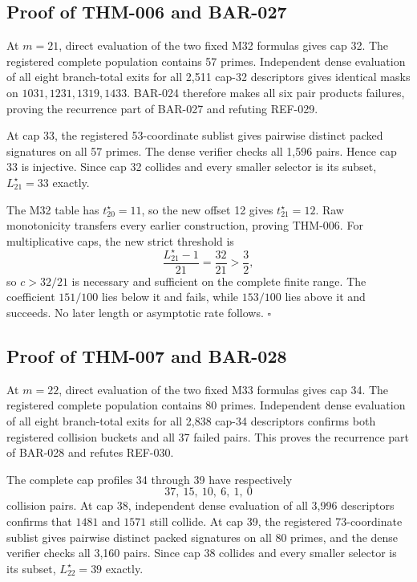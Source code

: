 \documentclass[11pt]{article}
\begin{document}
\subsection{Proof of THM-006 and BAR-027}
\label{proof:THM-006-BAR-027}

At \(m=21\), direct evaluation of the two fixed M32 formulas gives cap 32.
The registered complete population contains 57 primes. Independent dense
evaluation of all eight branch-total exits for all 2,511 cap-32 descriptors
gives identical masks on \(1031,1231,1319,1433\). BAR-024 therefore makes
all six pair products failures, proving the recurrence part of BAR-027 and
refuting REF-029.

At cap 33, the registered 53-coordinate sublist gives pairwise distinct
packed signatures on all 57 primes. The dense verifier checks all 1,596
pairs. Hence cap 33 is injective. Since cap 32 collides and every smaller
selector is its subset, \(L_{21}^\star=33\) exactly.

The M32 table has \(t_{20}^\star=11\), so the new offset 12 gives
\(t_{21}^\star=12\). Raw monotonicity transfers every earlier construction,
proving THM-006. For multiplicative caps, the new strict threshold is
\[
\frac{L_{21}^\star-1}{21}=\frac{32}{21}>\frac32,
\]
so \(c>32/21\) is necessary and sufficient on the complete finite range.
The coefficient \(151/100\) lies below it and fails, while \(153/100\) lies
above it and succeeds. No later length or asymptotic rate follows.
\(\square\)

\subsection{Proof of THM-007 and BAR-028}
\label{proof:THM-007-BAR-028}

At \(m=22\), direct evaluation of the two fixed M33 formulas gives cap 34.
The registered complete population contains 80 primes. Independent dense
evaluation of all eight branch-total exits for all 2,838 cap-34 descriptors
confirms both registered collision buckets and all 37 failed pairs. This
proves the recurrence part of BAR-028 and refutes REF-030.

The complete cap profiles 34 through 39 have respectively
\[
37,\ 15,\ 10,\ 6,\ 1,\ 0
\]
collision pairs. At cap 38, independent dense evaluation of all 3,996
descriptors confirms that \(1481\) and \(1571\) still collide. At cap 39,
the registered 73-coordinate sublist gives pairwise distinct packed
signatures on all 80 primes, and the dense verifier checks all 3,160 pairs.
Since cap 38 collides and every smaller selector is its subset,
\(L_{22}^\star=39\) exactly.
\end{document}
